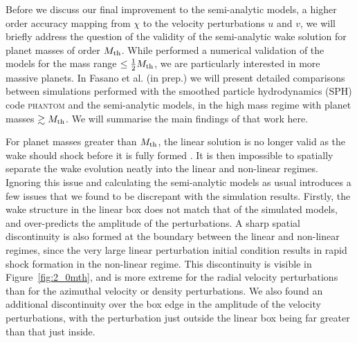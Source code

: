 \vspace{0.2cm}

Before we discuss our final improvement to the semi-analytic models, a higher order accuracy mapping from $\chi$ to the velocity perturbations $u$ and $v$, we will briefly address the question of the validity of the semi-analytic wake solution for planet masses of order $M_{\rm th}$.
While \citet{cimerman2021} performed a numerical validation of the models for the mass range $\le \frac{1}{2} M_{\rm th}$, we are particularly interested in more massive planets.
In Fasano et al. (in prep.) we will present detailed comparisons between simulations performed with the smoothed particle hydrodynamics (SPH) code \textsc{phantom} \citep{price2018} and the semi-analytic models, in the high mass regime with planet masses $\gtrsim M_{\rm th}$.
We will summarise the main findings of that work here.

For planet masses greater than $M_{\rm th}$, the linear solution is no longer valid as the wake should shock before it is fully formed \citep{goodman2001}.
It is then impossible to spatially separate the wake evolution neatly into the linear and non-linear regimes.
Ignoring this issue and calculating the semi-analytic models as usual introduces a few issues that we found to be discrepant with the simulation results.
Firstly, the wake structure in the linear box does not match that of the simulated models, and over-predicts the amplitude of the perturbations.
A sharp spatial discontinuity is also formed at the boundary between the linear and non-linear regimes, since the very large linear perturbation initial condition results in rapid shock formation in the non-linear regime.
This discontinuity is visible in Figure~\ref{fig:2_0mth}, and is more extreme for the radial velocity perturbations than for the azimuthal velocity or density perturbations.
We also found an additional discontinuity over the box edge in the amplitude of the velocity perturbations, with the perturbation just outside the linear box being far greater than that just inside.

